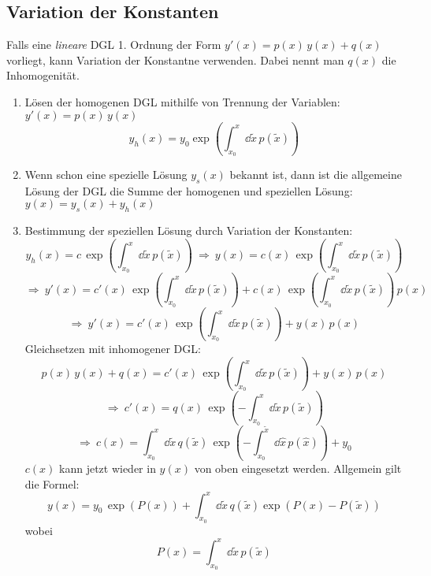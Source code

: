 \subsection{Variation der Konstanten}
\vspace{5pt}
\begin{framedprop}
Falls eine \textit{lineare} DGL 1. Ordnung der Form $y'(x) = p(x) \, y(x) + q(x)$ vorliegt, kann Variation der Konstantne verwenden. Dabei nennt man $q(x)$ die Inhomogenität.

\begin{enumerate}
	\item Lösen der homogenen DGL mithilfe von Trennung der Variablen: $y'(x) = p(x) \, y(x)$
	\[
	y_h(x) = y_0 \exp\left(\int_{x_0}^{x} \dd \tilde{x} \, p(\tilde{x})\right)
	\]
	
	\item Wenn schon eine spezielle Lösung $y_s(x)$ bekannt ist, dann ist die allgemeine Lösung der DGL die Summe der homogenen und speziellen Lösung: $y(x) = y_s(x) + y_h(x)$
	
	\item Bestimmung der speziellen Lösung durch Variation der Konstanten:
	\[
	y_h(x) = c \, \exp\left(\int_{x_0}^{x} \dd \tilde{x} \, p(\tilde{x})\right) \ \Rightarrow\ y(x) = c(x) \, \exp\left(\int_{x_0}^{x} \dd \tilde{x} \, p(\tilde{x})\right)
	\]
	\[
	\Rightarrow\ y'(x) = c'(x) \, \exp\left(\int_{x_0}^{x} \dd \tilde{x} \, p(\tilde{x})\right) + c(x) \, \exp\left(\int_{x_0}^{x} \dd \tilde{x} \, p(\tilde{x})\right) \, p(x)
	\]
	\[
	\Rightarrow\ y'(x) = c'(x) \, \exp\left(\int_{x_0}^{x} \dd \tilde{x} \, p(\tilde{x})\right) + y(x) \, p(x)
	\]
	Gleichsetzen mit inhomogener DGL:
	\[
	p(x) \, y(x) + q(x) = c'(x) \, \exp\left(\int_{x_0}^{x} \dd \tilde{x} \, p(\tilde{x})\right) + y(x) \, p(x)
	\]
	\[
	\Rightarrow\ c'(x) = q(x) \, \exp\left(-\int_{x_0}^{x} \dd \tilde{x} \, p(\tilde{x})\right)
	\]
	\[
	\Rightarrow\ c(x) = \int_{x_0}^{x} \dd \tilde{x} \, q(\tilde{x}) \, \exp\left(- \int_{x_0}^{\tilde{x}} \dd \hat{x} \, p(\hat{x})\right) + y_0
	\]
	$c(x)$ kann jetzt wieder in $y(x)$ von oben eingesetzt werden. Allgemein gilt die Formel:
	\[
	y(x) = y_0 \, \exp(P(x)) + \int_{x_0}^{x} \dd \tilde{x} \, q(\tilde{x}) \exp(P(x) - P(\tilde{x})) 
	\]
	wobei 
	\[
	P(x) = \int_{x_0}^{x} \dd \tilde{x} \, p(\tilde{x})
	\]
\end{enumerate}

\end{framedprop}

